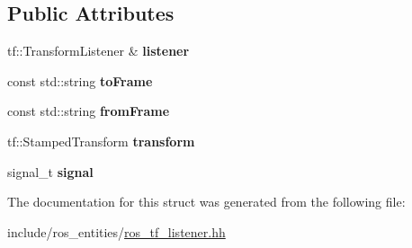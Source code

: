 \subsection*{Public Attributes}
\begin{DoxyCompactItemize}
\item 
tf\+::\+Transform\+Listener \& {\bfseries listener}\hypertarget{structdynamic__graph_1_1internal_1_1TransformListenerData_ae83ed824d8e7350c639d3a4b8f8c7c51}{}\label{structdynamic__graph_1_1internal_1_1TransformListenerData_ae83ed824d8e7350c639d3a4b8f8c7c51}

\item 
const std\+::string {\bfseries to\+Frame}\hypertarget{structdynamic__graph_1_1internal_1_1TransformListenerData_a35c066b704b49bad5319aeefd6955edf}{}\label{structdynamic__graph_1_1internal_1_1TransformListenerData_a35c066b704b49bad5319aeefd6955edf}

\item 
const std\+::string {\bfseries from\+Frame}\hypertarget{structdynamic__graph_1_1internal_1_1TransformListenerData_a95d5dd80a8b2eb36e42515c5e20ea514}{}\label{structdynamic__graph_1_1internal_1_1TransformListenerData_a95d5dd80a8b2eb36e42515c5e20ea514}

\item 
tf\+::\+Stamped\+Transform {\bfseries transform}\hypertarget{structdynamic__graph_1_1internal_1_1TransformListenerData_a79d1956bbae0f50368633551cee1995b}{}\label{structdynamic__graph_1_1internal_1_1TransformListenerData_a79d1956bbae0f50368633551cee1995b}

\item 
signal\+\_\+t {\bfseries signal}\hypertarget{structdynamic__graph_1_1internal_1_1TransformListenerData_aa8e36737907c1f68321dd2535cf11620}{}\label{structdynamic__graph_1_1internal_1_1TransformListenerData_aa8e36737907c1f68321dd2535cf11620}

\end{DoxyCompactItemize}


The documentation for this struct was generated from the following file\+:\begin{DoxyCompactItemize}
\item 
include/ros\+\_\+entities/\hyperlink{ros__tf__listener_8hh}{ros\+\_\+tf\+\_\+listener.\+hh}\end{DoxyCompactItemize}
